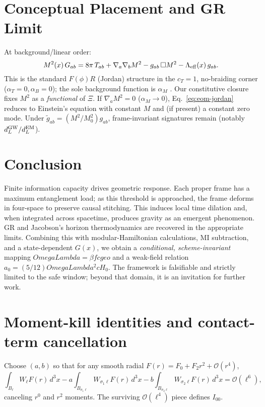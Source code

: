 \documentclass[aps,prd,onecolumn,superscriptaddress,nofootinbib]{revtex4-2}
\def\OmL{OmegaLambda}%
\def\cgeo{cgeo}%
\newcommand{\OmL}{\Omega_\Lambda}
\newcommand{\cgeo}{c_{\rm geo}}
\begin{document}
\section{Conceptual Placement and GR Limit}
\label{sec:GR-Horndeski}
At background/linear order:
\begin{equation}
M^2(x)\, G_{ab}
= 8\pi\, T_{ab}
+ \nabla_a\nabla_b M^2
- g_{ab}\,\Box M^2
- \Lambda_{\rm eff}(x)\, g_{ab}.
\label{eq:eom-jordan}
\end{equation}
This is the standard \(F(\phi)R\) (Jordan) structure in the \(c_T=1\), no-braiding corner (\(\alpha_T=0,\alpha_B=0\)); the sole background function is \(\alpha_M\) \cite{BelliniSawicki2014}. Our constitutive closure fixes \(M^2\) as a \emph{functional} of \(\Xi\). If \(\nabla_a M^2=0\) (\(\alpha_M\to0\)), Eq.~\eqref{eq:eom-jordan} reduces to Einstein’s equation with constant \(M\) and (if present) a constant zero mode. Under \(\tilde g_{ab}=(M^2/M_0^2)g_{ab}\), frame-invariant signatures remain (notably \(d_L^{\rm GW}/d_L^{\rm EM}\)).

\section{Conclusion}
Finite information capacity drives geometric response. Each proper frame has a maximum entanglement load; as this threshold is approached, the frame deforms in four-space to preserve causal stitching. This induces local time dilation and, when integrated across spacetime, produces gravity as an emergent phenomenon. GR and Jacobson’s horizon thermodynamics are recovered in the appropriate limits. Combining this with modular-Hamiltonian calculations, MI subtraction, and a state-dependent \(G(x)\), we obtain a \emph{conditional, scheme-invariant} mapping \(\OmL=\beta f \cgeo\) and a weak-field relation \(a_0=(5/12)\OmL^2 cH_0\). The framework is falsifiable and strictly limited to the safe window; beyond that domain, it is an invitation for further work.

\appendix

\section{Moment-kill identities and contact-term cancellation}
\label{app:MI-momentkill}
Choose \((a,b)\) so that for any smooth radial \(F(r)=F_0+F_2 r^2+\mathcal O(r^4)\),
\begin{equation}
\int_{B_\ell}\!W_\ell F(r)\,d^3x - a\!\int_{B_{\sigma_1\ell}}\!W_{\sigma_1\ell}F(r)\,d^3x - b\!\int_{B_{\sigma_2\ell}}\!W_{\sigma_2\ell}F(r)\,d^3x = \mathcal O(\ell^6),
\end{equation}
canceling \(r^0\) and \(r^2\) moments. The surviving \(\mathcal O(\ell^4)\) piece defines \(I_{00}\).
\end{document}
